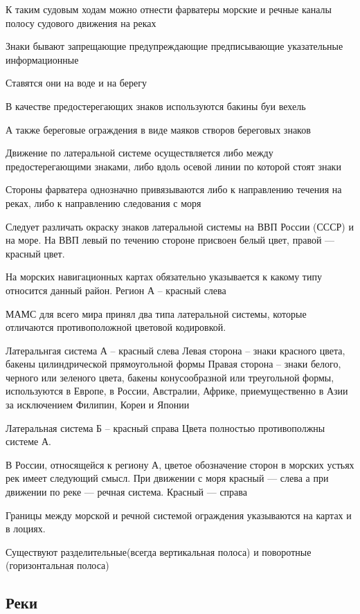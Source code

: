 \documentclass{article}        %
\begin{document}
\begin{description}
К таким судовым ходам можно отнести 
	фарватеры
	морские и речные каналы
	полосу судового движения на реках


Знаки бывают
	запрещающие
	предупреждающие
	предписывающие
	указательные
	информационные

Ставятся они на воде и на берегу

В качестве предостерегающих знаков используются
	бакины
	буи
	вехель

А также береговые ограждения в виде
	маяков
	створов
	береговых знаков

Движение по латеральной системе осуществляется либо между предостерегающими знаками, 
либо вдоль осевой линии по которой стоят знаки

Стороны фарватера однозначно привязываются либо к направлению течения на реках, либо к направлению следования с моря


Следует различать окраску знаков латеральной системы на ВВП России (СССР) и на море.
На ВВП левый по течению стороне присвоен белый цвет, правой --- красный цвет.

На морских навигационных картах обязательно указывается к какому типу относится данный район.
Регион А -- красный слева

МАМС для всего мира принял два типа латеральной системы, 
которые отличаются противоположной цветовой кодировкой.

Латеральнгая система А -- красный слева
Левая сторона -- знаки красного цвета, бакены цилиндрической прямоугольной формы
Правая сторона -- знаки белого, черного или зеленого цвета, бакены конусообразной или треугольной формы, используются в Европе, в России, Австралии, Африке, приемущественно в Азии за исключением Филипин, Кореи и Японии


Латеральная система Б -- красный справа
Цвета полностью противополжны системе А.

В России, относящейся к региону А, цветое обозначение сторон в морских устьях рек 
имеет следующий смысл. При движении с моря красный --- слева
а при движении по реке --- речная система. Красный --- справа

Границы между морской и речной системой ограждения указываются на картах и в лоциях.

Существуют разделительные(всегда вертикальная полоса) и поворотные (горизонтальная полоса)


\subsection{Реки}


\end{description}
\end{document}
